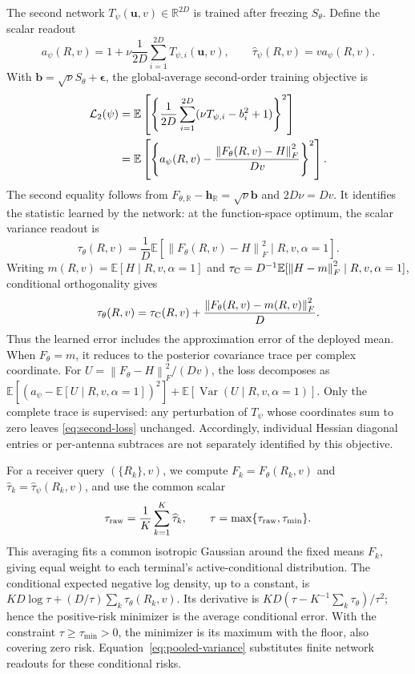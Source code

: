 \documentclass[10pt,a4paper]{article}
\newcommand{\E}{\mathbb{E}}
\newcommand{\norm}[1]{\left\lVert#1\right\rVert}
\begin{document}
The second network $T_\psi(\mathbf{u},v)\in\mathbb{R}^{2D}$ is trained
after freezing $S_\theta$. Define the scalar readout
\begin{equation}
 a_\psi(R,v)=1+\nu\frac{1}{2D}\sum_{i=1}^{2D}T_{\psi,i}(\mathbf{u},v),
 \qquad \widehat\tau_\psi(R,v)=v a_\psi(R,v).
 \label{eq:second-readout}
\end{equation}
With $\mathbf{b}=\sqrt\nu S_\theta+\bm\epsilon$, the global-average
second-order training objective is
\begin{align}
 \mathcal{L}_2(\psi)
 &=\E\left[\left\{
 \frac{1}{2D}\sum_{i=1}^{2D}(\nu T_{\psi,i}-b_i^2+1)
                            \right\}^2\right]\notag\\
 &=\E\left[\left\{
 a_\psi(R,v)-\frac{\norm{F_\theta(R,v)-H}_F^2}{Dv}
                            \right\}^2\right].
 \label{eq:second-loss}
\end{align}
The second equality follows from
$F_{\theta,\mathbb R}-\mathbf{h}_{\mathbb R}=\sqrt\nu\mathbf{b}$ and
$2D\nu=Dv$. It identifies the statistic learned by the network: at the
function-space optimum, the scalar variance readout is
\begin{equation}
 \tau_\theta(R,v)=\frac{1}{D}\E[
 \norm{F_\theta(R,v)-H}_F^2\mid R,v,\alpha=1].
 \label{eq:conditional-risk}
\end{equation}
Writing $m(R,v)=\E[H\mid R,v,\alpha=1]$ and
$\tau_{\rm C}=D^{-1}\E[\norm{H-m}_F^2\mid R,v,\alpha=1]$, conditional
orthogonality gives
\begin{equation}
 \tau_\theta(R,v)=\tau_{\rm C}(R,v)
             +\frac{\norm{F_\theta(R,v)-m(R,v)}_F^2}{D}.
 \label{eq:risk-decomposition}
\end{equation}
Thus the learned error includes the approximation error of the deployed
mean. When $F_\theta=m$, it reduces to the posterior covariance trace
per complex coordinate. For $U=\norm{F_\theta-H}_F^2/(Dv)$, the loss
decomposes as
$\E[(a_\psi-\E[U\mid R,v,\alpha=1])^2]
+\E[\operatorname{Var}(U\mid R,v,\alpha=1)]$.
Only the complete trace is supervised: any perturbation of $T_\psi$
whose coordinates sum to zero leaves \eqref{eq:second-loss} unchanged.
Accordingly, individual Hessian diagonal entries or per-antenna
subtraces are not separately identified by this objective.

For a receiver query $(\{R_k\},v)$, we compute
$F_k=F_\theta(R_k,v)$ and $\widehat\tau_k=\widehat\tau_\psi(R_k,v)$,
and use the common scalar
\begin{equation}
 \tau_{\rm raw}=\frac1K\sum_{k=1}^{K}\widehat\tau_k,\qquad
 \tau=\max\{\tau_{\rm raw},\tau_{\min}\}.
 \label{eq:pooled-variance}
\end{equation}
This averaging fits a common isotropic Gaussian around the fixed means
$F_k$, giving equal weight to each terminal's active-conditional
distribution. The conditional expected negative log density, up to a
constant, is $KD\log\tau+(D/\tau)\sum_k\tau_\theta(R_k,v)$.
Its derivative is $KD(\tau-K^{-1}\sum_k\tau_\theta)/\tau^2$; hence the
positive-risk minimizer is the average conditional error. With the
constraint $\tau\geq\tau_{\min}>0$, the minimizer is its maximum with
the floor, also covering zero risk. Equation~\eqref{eq:pooled-variance}
substitutes finite network readouts for these conditional risks.
\end{document}
